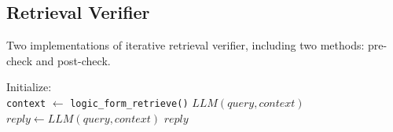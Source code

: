 \documentclass[11pt]{article}
\begin{document}

\subsection{Retrieval Verifier}
\label{sec:A.4}
Two implementations of iterative retrieval verifier, including  two methods: pre-check and post-check.

\begin{algorithm}[H]
\caption{Retrieval Verifier}
\begin{algorithmic}[1]
    \State Initialize: 
    \\
    \texttt{context} $\gets$ \texttt{logic\_form\_retrieve()}
    \Statex \hspace{\algorithmicindent} %
    \State \Return $LLM(query, context)$
\EndIf
    \EndFunction
    \Statex \hspace{\algorithmicindent} %
        \State $reply \gets LLM(query, context)$
    \State \Return $reply$
\EndIf
    \EndFunction
\end{algorithmic}
\label{algo:check}
\end{algorithm}


\end{document}
